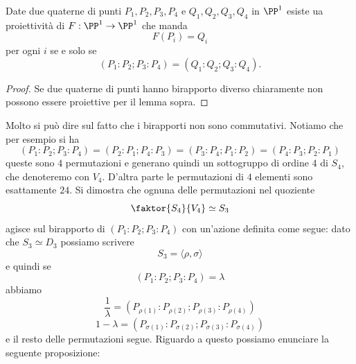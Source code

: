 \documentclass[11pt]{scrartcl}
\begin{document}
   	 \begin{corollary}
   	 	Date due quaterne di punti $P_1,P_2,P_3,P_4$ e $Q_1,Q_2,Q_3,Q_4$ in $\PP^1$ esiste ua proiettività di $F:\PP^1\to\PP^1$ che manda 
   	 	$$F(P_i)=Q_i$$
   	 	per ogni $i$ se e solo se 
   	 	$$(P_1:P_2;P_3:P_4)=(Q_1:Q_2;Q_3:Q_4).$$
   	 \end{corollary}
   	 \begin{proof}
   	 	Se due quaterne di punti hanno birapporto diverso chiaramente non possono essere proiettive per il lemma sopra. 
   	 \end{proof}
   	 Molto si può dire sul fatto che i birapporti non sono commutativi. Notiamo che per esempio si ha
   	 $$(P_1:P_2;P_3:P_4)=(P_2:P_1;P_4:P_3)=(P_3:P_4;P_1:P_2)=(P_4:P_3;P_2:P_1)$$
   	 queste sono $4$ permutazioni e generano quindi un sottogruppo di ordine $4$ di $S_4$, che denoteremo con $V_4$. D'altra parte le permutazioni di $4$ elementi sono esattamente $24$. Si dimostra che ognuna delle permutazioni nel quoziente $$\faktor{S_4}{V_4}\simeq S_3$$
   	 agisce sul birapporto di $(P_1:P_2;P_3:P_4)$ con un'azione definita come segue: dato che $S_3\simeq D_3$ possiamo scrivere
   	 $$S_3=\langle \rho,\sigma\rangle$$
   	 e quindi se
   	 $$(P_1:P_2;P_3:P_4)=\lambda$$
   	 abbiamo
   	 $$\frac{1}{\lambda}=\left(P_{\rho(1)}:P_{\rho(2)};P_{\rho(3)}:P_{\rho(4)}\right)$$
   	 $$1-\lambda=\left(P_{\sigma(1)}:P_{\sigma(2)};P_{\sigma(3)}:P_{\sigma(4)}\right)$$
   	 e il resto delle permutazioni segue. Riguardo a questo possiamo enunciare la seguente proposizione:
\end{document}

